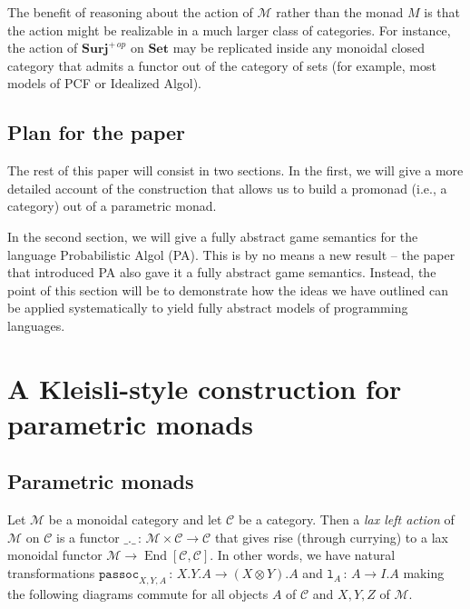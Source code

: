 \documentclass{svproc}
\newcommand\C{\mathcal{C}}
\newcommand\M{\mathcal{M}}
\newcommand\from{\,\colon\,}
\DeclareMathOperator{\End}{End}
\newcommand{\passoc}{\texttt{passoc}}
\newcommand\tensor\otimes
\newcommand\lun{\texttt{l}}
\newcommand{\catname}[1]{\mathbf{#1}}
\newcommand{\Set}{\catname{Set}}
\newcommand{\Surj}{\catname{Surj}}
\begin{document}
The benefit of reasoning about the action of $\M$ rather than the monad $M$ is that the action might be realizable in a much larger class of categories.  
For instance, the action of $\Surj^{+\,op}$ on $\Set$ may be replicated inside any monoidal closed category that admits a functor out of the category of sets (for example, most models of PCF or Idealized Algol).

\subsection{Plan for the paper}

The rest of this paper will consist in two sections.  
In the first, we will give a more detailed account of the construction that allows us to build a promonad (i.e., a category) out of a parametric monad.  

In the second section, we will give a fully abstract game semantics for the language Probabilistic Algol (PA).  
This is by no means a new result -- the paper \cite{DanosHarmer} that introduced PA also gave it a fully abstract game semantics.  
Instead, the point of this section will be to demonstrate how the ideas we have outlined can be applied systematically to yield fully abstract models of programming languages.

\section{A Kleisli-style construction for parametric monads}

\subsection{Parametric monads}

Let $\M$ be a monoidal category and let $\C$ be a category.  
Then a \emph{lax left action} of $\M$ on $\C$ is a functor $\_.\_\from \M\times\C\to \C$ that gives rise (through currying) to a lax monoidal functor $\M\to \End[\C,\C]$.  
In other words, we have natural transformations $\passoc_{X,Y,A}\from X.Y.A\to (X\tensor Y).A$ and $\lun_A\from A \to I.A$ making the following diagrams commute for all objects $A$ of $\C$ and $X,Y,Z$ of $\M$.
\end{document}
